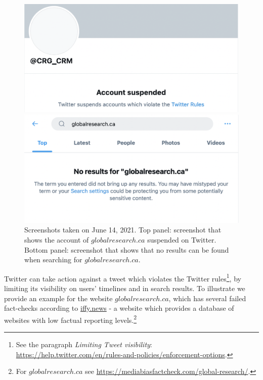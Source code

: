 \documentclass{article}
\begin{document}
\begin{figure}
	\centering
		\begin{multicols}{1}	
			\includegraphics[scale=0.35]{./img/globalresearch_2021-06-14.png}
		\end{multicols}
		
		\begin{multicols}{1}
			\includegraphics[scale=0.35]{./img/globalresearch_14_06_2021_16pm_UTC.png} 
		\end{multicols}
		\caption{Screenshots taken on June 14, 2021. Top panel: screenshot that shows the account of $globalresearch.ca$ suspended on Twitter. Bottom panel: screenshot that shows that no results can be found when searching for $globalresearch.ca$.    }
		\label{fig3}
\end{figure}

Twitter can take action against a tweet which violates the Twitter rules\footnote{See the paragraph {\it Limiting Tweet visibility}: \href{https://help.twitter.com/en/rules-and-policies/enforcement-options}{https://help.twitter.com/en/rules-and-policies/enforcement-options}.}, by limiting its visibility on users' timelines and in search results. To illustrate we provide an example for the website $globalresearch.ca$, which has several failed fact-checks according to \href{https://iffy.news}{iffy.news} - a website which provides a database of websites with low factual reporting levels.\footnote{For $globalresearch.ca$ see \href{https://mediabiasfactcheck.com/global-research/}{https://mediabiasfactcheck.com/global-research/}.}
\end{document}
